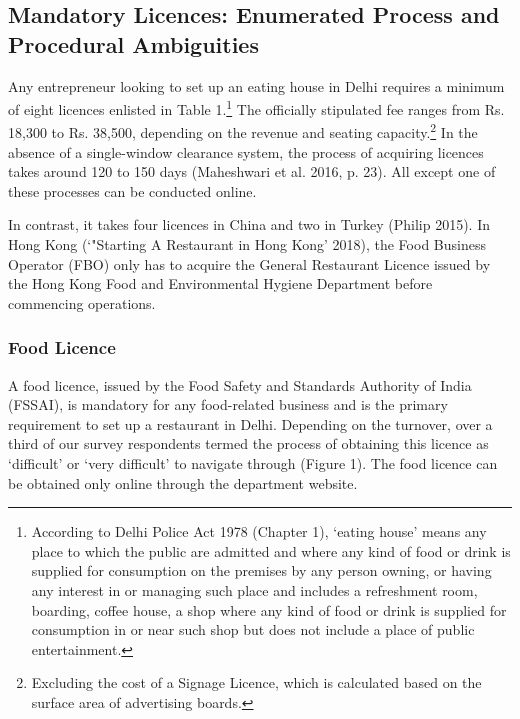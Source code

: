 \documentclass[a4paper, 12pt]{article}
\begin{document}
                    
                    \subsection{Mandatory Licences: Enumerated Process and Procedural Ambiguities}
                     Any entrepreneur looking to set up an eating house in Delhi requires a minimum of eight licences enlisted in Table 1.\footnote{According to Delhi Police Act 1978 (Chapter 1), ‘eating house’ means any place to which the public are admitted and where 
any kind of food or drink is supplied for consumption on the premises by any person owning, or having any interest in or managing such place and includes a refreshment room, boarding, coffee house, a shop where any kind of food or drink is supplied for 
consumption in or near such shop but does not include a place of public entertainment.} The officially stipulated fee ranges from Rs. 18,300 to Rs. 38,500, depending on the revenue and seating capacity.\footnote{Excluding the cost of a Signage Licence, which is 
calculated based on the surface area of advertising boards.} In the absence of a single-window clearance system, the process of acquiring licences takes around 120 to 150 days (Maheshwari et al. 2016, p. 23). All except one of these processes can be conducted 
online.
     
                   In contrast, it takes four licences in China and two in Turkey (Philip 2015). In Hong Kong (‘"Starting A Restaurant in Hong Kong’ 2018), the Food Business Operator (FBO) only has to acquire the General Restaurant Licence issued by the Hong Kong 
Food and Environmental Hygiene Department before commencing operations.
                    
                                        
                    \subsubsection{Food Licence}
                    A food licence, issued by the Food Safety and Standards Authority of India (FSSAI), is mandatory for any food-related business and is the primary requirement to set up a restaurant in Delhi. Depending on the turnover, over a third of our survey 
respondents termed the process of obtaining this licence as ‘difficult’ or ‘very difficult’ to navigate through (Figure 1). The food licence can be obtained only online through the department website.
                    
\end{document}
